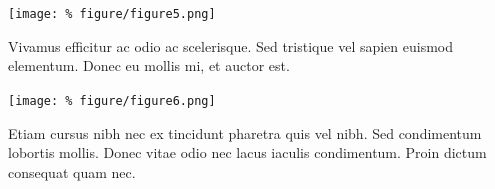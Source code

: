 \documentclass[unknownkeysallowed,usepdftitle=false, parskip=full]{beamer}
\newcommand{\secvariable}{nothing}
\newcommand{\mysection}[1]{\renewcommand{\secvariable}{#1}
}
\begin{document}
\mysection{major}
\begin{frame}\label{\secvariable} %
\begin{center}
\texttt{[image: \%
figure/figure5.png]}
\end{center}

    \parbox{\linewidth}{

Vivamus efficitur ac odio ac scelerisque. Sed tristique vel sapien euismod elementum. Donec eu mollis mi, et auctor est.
}
\end{frame}

\mysection{slab}
\begin{frame}\label{\secvariable}
\begin{center}
\texttt{[image: \%
figure/figure6.png]}
\end{center}
    \parbox{\linewidth}{

Etiam cursus nibh nec ex tincidunt pharetra quis vel nibh. Sed condimentum lobortis mollis. Donec vitae odio nec lacus iaculis condimentum. Proin dictum consequat quam nec. \hyperlink{slabtable}{}
}

\end{frame}
\end{document}
